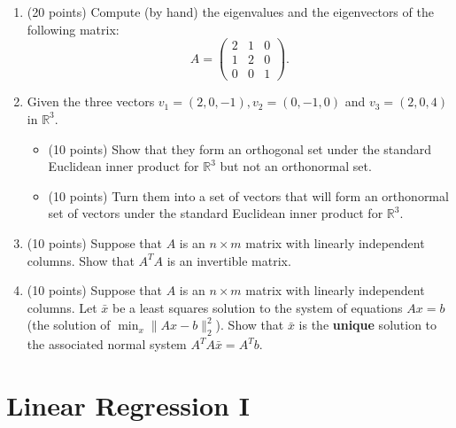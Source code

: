 \documentclass[11pt]{article}
\begin{document}
\begin{enumerate}
\item (20 points) Compute (by hand) the eigenvalues and the eigenvectors of the following matrix:
$$A = \begin{pmatrix} 2 & 1 & 0 \\ 1 & 2& 0\\ 0 & 0 & 1 \end{pmatrix}.$$
\item Given the three vectors $v_1 = (2, 0, -1), v_2 = (0, -1, 0)$ and $v_3 = (2, 0, 4)$ in $\mathbb R^3$.
\begin{itemize}
\item (10 points) Show that they form an orthogonal set under the standard 
      Euclidean inner product for $\mathbb R^3$ but not an orthonormal set. 
\item (10 points) Turn them into a set of vectors that will form an orthonormal set of 
      vectors under the standard Euclidean inner product for $\mathbb R^3$. 
\end{itemize}

\item (10 points) Suppose that $A$ is an $n \times m$ matrix with linearly independent columns.
      Show that $A^T A$ is an invertible matrix. 

\item (10 points) Suppose that $A$ is an $n \times m$ matrix with linearly independent columns.
      Let $\bar x$ be a least squares solution to the system of equations $Ax = b$ (the solution of $\min_x \|Ax - b\|_2^2$).
      Show that $\bar x$ is the \textbf{unique} solution to the associated normal system 
      $A^T A \bar x = A^T b$. 

\end{enumerate}


\section{Linear Regression I} 
\end{document}
